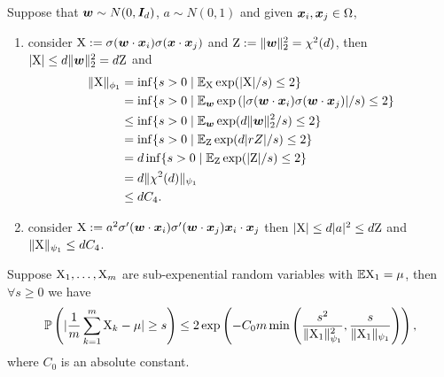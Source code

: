 \documentclass{article}
\begin{document}
\begin{rmk}
    Suppose that $\bm{w}\sim N(0,\bm{I}_d)$, $a\sim N(0,1)$ and given $\bm{x}_i,\bm{x}_j \in\Omega$,
    \begin{enumerate}
        \item consider $\textnormal{X}:=\sigma(\bm{w}\cdot\bm{x}_i)\sigma(\bm{x}\cdot\bm{x}_j)$ and $\textnormal{Z}:=\lVert\bm{w}\rVert^2_2=\chi^2(d)$, then $\lvert\textnormal{X}\rvert\leq d\lVert\bm{w}\rVert^2_2=d\textnormal{Z}$ and
              \begin{equation}
                  \begin{aligned}
                      \lVert\textnormal{X}\rVert_{\phi_1}
                       & =\inf\{s>0\mid\mathbb{E}_{\textnormal{X}}\exp(\lvert\textnormal{X}\rvert/s)\leq 2\}                                                   \\
                       & =\inf\{s>0\mid\mathbb{E}_{\bm{w}}\exp\left(\lvert\sigma(\bm{w}\cdot\bm{x}_i)\sigma(\bm{w}\cdot\bm{x}_j)\rvert/s\right)\leq 2\} \\
                       & \leq\inf\{s>0\mid\mathbb{E}_{\bm{w}}\exp(d\lVert\bm{w}\rVert^2_2/s)\leq 2\}                                          \\
                       & =\inf\{s>0\mid\mathbb{E}_{\textnormal{Z}}\exp(d\lvert rZ\rvert/s)\leq 2\}                                                   \\
                       & =d\inf\{s>0\mid\mathbb{E}_{\textnormal{Z}}\exp(\lvert\textnormal{Z}\rvert/s)\leq 2\}                                                  \\
                       & =d\lVert\chi^2(d)\rVert_{\psi_1}                                                                         \\
                       & \leq dC_{4}.
                  \end{aligned}
              \end{equation}
        \item consider $\textnormal{X}:=a^2\sigma'(\bm{w}\cdot\bm{x}_i)\sigma'(\bm{w}\cdot\bm{x}_j)\bm{x}_i\cdot\bm{x}_j$ then $\lvert\textnormal{X}\rvert\leq d\lvert a\rvert^2\leq d\textnormal{Z}$ and $\lVert\textnormal{X}\rVert_{\psi_1}\leq dC_{4}$.
    \end{enumerate}
\end{rmk}
\begin{thm}\label{thm:sub_exp}
    Suppose $\textnormal{X}_1,\ldots,\textnormal{X}_m$ are sub-expenential random variables with $\mathbb{E}\textnormal{X}_1=\mu$, then $\forall s\geq 0$ we have
    \begin{equation}
        \mathbb{P}\left(\lvert\frac{1}{m}\sum_{k=1}^m\textnormal{X}_k-\mu\rvert\geq s\right)\leq 2\exp\left(-C_0 m \min\left(\frac{s^2}{\lVert\textnormal{X}_1\rVert^2_{\psi_1}},\frac{s}{\lVert\textnormal{X}_1\rVert_{\psi_1}}\right)\right),
    \end{equation}
    where $C_0$ is an absolute constant.
\end{thm}
\end{document}
